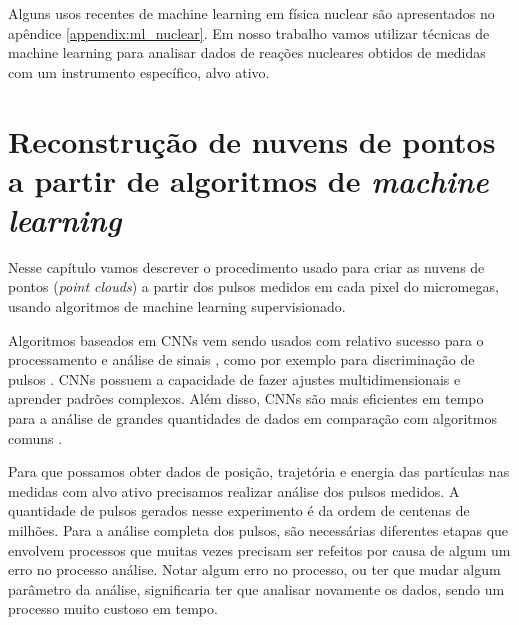 \documentclass[a4paper,12pt,oneside]{book}
\begin{document}

\par Alguns usos recentes de machine learning em física nuclear são apresentados no apêndice \ref{appendix:ml_nuclear}. Em nosso trabalho vamos utilizar técnicas de machine learning para analisar dados de reações nucleares obtidos de medidas com um instrumento específico, alvo ativo.


\chapter{Reconstrução de nuvens de pontos a partir de algoritmos de \textit{machine learning}}\label{chapter:sinais}

\par Nesse capítulo vamos descrever o procedimento usado para criar as nuvens de pontos (\textit{point clouds}) a partir dos pulsos medidos em cada pixel do micromegas, usando algoritmos de machine learning supervisionado.

\par Algoritmos baseados em CNNs vem sendo usados com relativo sucesso para o processamento e análise de sinais \cite{FORTINO2022166497}, como por exemplo para discriminação de pulsos \cite{Holl2019}. CNNs possuem a capacidade de fazer ajustes multidimensionais e aprender padrões complexos. Além disso, CNNs são mais eficientes em tempo para a análise de grandes quantidades de dados em comparação com algoritmos comuns \cite{FORTINO2022166497}.

\par Para que possamos obter dados de posição, trajetória e energia das partículas nas medidas com alvo ativo precisamos realizar análise dos pulsos medidos. A quantidade de pulsos gerados nesse experimento é da ordem de centenas de milhões. Para a análise completa dos pulsos, são necessárias diferentes etapas que envolvem processos que muitas vezes precisam ser refeitos por causa de algum um erro no processo análise. Notar algum erro no processo, ou ter que mudar algum parâmetro da análise, significaria ter que analisar novamente os dados, sendo um processo muito custoso em tempo.
\end{document}
